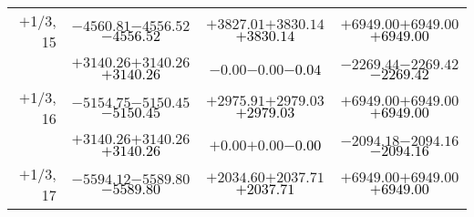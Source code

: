 \documentclass[compress]{beamer}
\begin{document}
\begin{frame}
{\begin{tabular}{r | c | c | c}
$+$1/3, 15 & $-4560.81$\hspace{0.1 cm}$-4556.52$\hspace{0.1 cm}\textcolor{black}{$-4556.52$} & $+3827.01$\hspace{0.1 cm}$+3830.14$\hspace{0.1 cm}\textcolor{black}{$+3830.14$} & $+6949.00$\hspace{0.1 cm}$+6949.00$\hspace{0.1 cm}\textcolor{black}{$+6949.00$} \\
           & $+3140.26$\hspace{0.1 cm}$+3140.26$\hspace{0.1 cm}\textcolor{black}{$+3140.26$} & $-0.00$\hspace{0.1 cm}$-0.00$\hspace{0.1 cm}\textcolor{black}{$-0.04$} & $-2269.44$\hspace{0.1 cm}$-2269.42$\hspace{0.1 cm}\textcolor{black}{$-2269.42$} \\
$+$1/3, 16 & $-5154.75$\hspace{0.1 cm}$-5150.45$\hspace{0.1 cm}\textcolor{black}{$-5150.45$} & $+2975.91$\hspace{0.1 cm}$+2979.03$\hspace{0.1 cm}\textcolor{black}{$+2979.03$} & $+6949.00$\hspace{0.1 cm}$+6949.00$\hspace{0.1 cm}\textcolor{black}{$+6949.00$} \\
           & $+3140.26$\hspace{0.1 cm}$+3140.26$\hspace{0.1 cm}\textcolor{black}{$+3140.26$} & $+0.00$\hspace{0.1 cm}$+0.00$\hspace{0.1 cm}\textcolor{black}{$-0.00$} & $-2094.18$\hspace{0.1 cm}$-2094.16$\hspace{0.1 cm}\textcolor{black}{$-2094.16$} \\
$+$1/3, 17 & $-5594.12$\hspace{0.1 cm}$-5589.80$\hspace{0.1 cm}\textcolor{black}{$-5589.80$} & $+2034.60$\hspace{0.1 cm}$+2037.71$\hspace{0.1 cm}\textcolor{black}{$+2037.71$} & $+6949.00$\hspace{0.1 cm}$+6949.00$\hspace{0.1 cm}\textcolor{black}{$+6949.00$} \\

\end{tabular}}
\end{frame}
\end{document}
